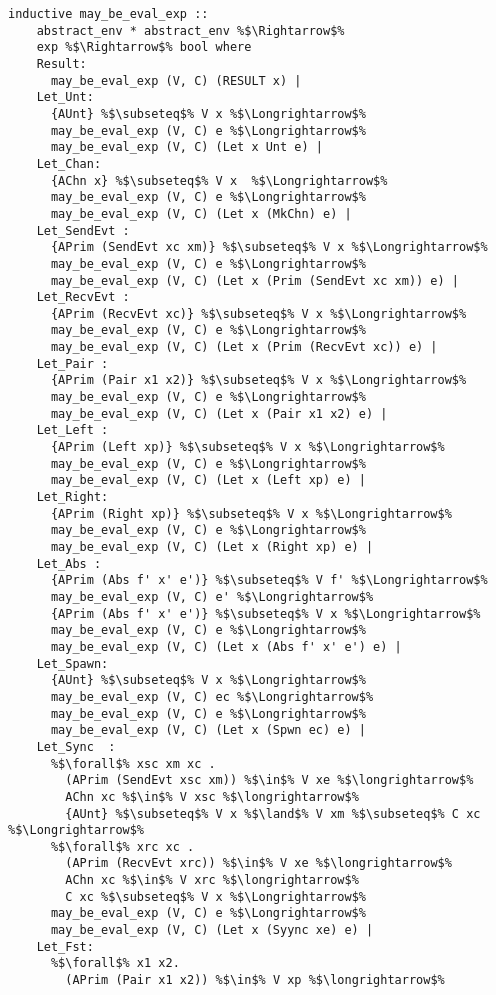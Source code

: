 \documentclass{article}
\begin{document}
\begin{lstlisting}[style=codestyle1, escapechar=\%]
  inductive may_be_eval_exp ::
    abstract_env * abstract_env %$\Rightarrow$%
    exp %$\Rightarrow$% bool where
    Result:
      may_be_eval_exp (V, C) (RESULT x) |
    Let_Unt:
      {AUnt} %$\subseteq$% V x %$\Longrightarrow$%
      may_be_eval_exp (V, C) e %$\Longrightarrow$% 
      may_be_eval_exp (V, C) (Let x Unt e) |
    Let_Chan: 
      {AChn x} %$\subseteq$% V x  %$\Longrightarrow$%
      may_be_eval_exp (V, C) e %$\Longrightarrow$%
      may_be_eval_exp (V, C) (Let x (MkChn) e) |
    Let_SendEvt : 
      {APrim (SendEvt xc xm)} %$\subseteq$% V x %$\Longrightarrow$%
      may_be_eval_exp (V, C) e %$\Longrightarrow$% 
      may_be_eval_exp (V, C) (Let x (Prim (SendEvt xc xm)) e) |
    Let_RecvEvt :
      {APrim (RecvEvt xc)} %$\subseteq$% V x %$\Longrightarrow$%
      may_be_eval_exp (V, C) e %$\Longrightarrow$% 
      may_be_eval_exp (V, C) (Let x (Prim (RecvEvt xc)) e) |
    Let_Pair : 
      {APrim (Pair x1 x2)} %$\subseteq$% V x %$\Longrightarrow$%
      may_be_eval_exp (V, C) e %$\Longrightarrow$% 
      may_be_eval_exp (V, C) (Let x (Pair x1 x2) e) |
    Let_Left : 
      {APrim (Left xp)} %$\subseteq$% V x %$\Longrightarrow$%
      may_be_eval_exp (V, C) e %$\Longrightarrow$% 
      may_be_eval_exp (V, C) (Let x (Left xp) e) |
    Let_Right:
      {APrim (Right xp)} %$\subseteq$% V x %$\Longrightarrow$%
      may_be_eval_exp (V, C) e %$\Longrightarrow$% 
      may_be_eval_exp (V, C) (Let x (Right xp) e) |
    Let_Abs : 
      {APrim (Abs f' x' e')} %$\subseteq$% V f' %$\Longrightarrow$%
      may_be_eval_exp (V, C) e' %$\Longrightarrow$%
      {APrim (Abs f' x' e')} %$\subseteq$% V x %$\Longrightarrow$%
      may_be_eval_exp (V, C) e %$\Longrightarrow$% 
      may_be_eval_exp (V, C) (Let x (Abs f' x' e') e) |
    Let_Spawn:
      {AUnt} %$\subseteq$% V x %$\Longrightarrow$%
      may_be_eval_exp (V, C) ec %$\Longrightarrow$% 
      may_be_eval_exp (V, C) e %$\Longrightarrow$%  
      may_be_eval_exp (V, C) (Let x (Spwn ec) e) |
    Let_Sync  : 
      %$\forall$% xsc xm xc . 
        (APrim (SendEvt xsc xm)) %$\in$% V xe %$\longrightarrow$% 
        AChn xc %$\in$% V xsc %$\longrightarrow$%
        {AUnt} %$\subseteq$% V x %$\land$% V xm %$\subseteq$% C xc %$\Longrightarrow$%
      %$\forall$% xrc xc . 
        (APrim (RecvEvt xrc)) %$\in$% V xe %$\longrightarrow$%
        AChn xc %$\in$% V xrc %$\longrightarrow$%
        C xc %$\subseteq$% V x %$\Longrightarrow$%
      may_be_eval_exp (V, C) e %$\Longrightarrow$%  
      may_be_eval_exp (V, C) (Let x (Syync xe) e) |
    Let_Fst: 
      %$\forall$% x1 x2.
        (APrim (Pair x1 x2)) %$\in$% V xp %$\longrightarrow$%

\end{lstlisting}
\end{document}
